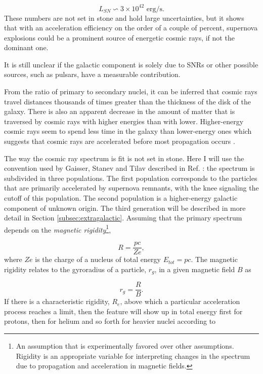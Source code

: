 \begin{equation}
L_{SN} \backsim 3 \times 10^{42} \textrm{ erg/s}.
\end{equation}
These numbers are not set in stone and hold large uncertainties, but it shows that with an acceleration efficiency on the order of a couple of percent, supernova explosions could be a prominent source of energetic cosmic rays, if not the dominant one.

It is still unclear if the galactic component is solely due to SNRs or other possible sources, such as pulsars, have a measurable contribution.

From the ratio of primary to secondary nuclei, it can be inferred that cosmic rays travel distances thousands of times greater than the thickness of the disk of the galaxy. There is also an apparent decrease in the amount of matter that is traversed by cosmic rays with higher energies than with lower. Higher-energy cosmic rays seem to spend less time in the galaxy than lower-energy ones which suggests that cosmic rays are accelerated before most propagation occurs \cite{Gaisser:2016uoy}.

The way the cosmic ray spectrum is fit is not set in stone. Here I will use the convention used by Gaisser, Stanev and Tilav described in Ref. \cite{Gaisser:2013bla}: the spectrum is subdivided in three populations. The first population corresponds to the particles that are primarily accelerated by supernova remnants, with the knee signaling the cutoff of this population. The second population is a higher-energy galactic component of unknown origin. The third generation will be described in more detail in Section \ref{subsec:extragalactic}. Assuming that the primary spectrum depends on the \textit{magnetic rigidity}\footnote{An assumption that is experimentally favored over other assumptions. Rigidity is an appropriate variable for interpreting changes in the spectrum due to propagation and acceleration in magnetic fields.},

\begin{equation}
R = \frac{pc}{Ze},
\end{equation}
where $Ze$ is the charge of a nucleus of total energy $E_{tot} = pc$. The magnetic rigidity relates to the gyroradius of a particle, $r_g$, in a given magnetic field $B$ as

\begin{equation}
\label{eq:gyro}
r_g = \frac{R}{B}.
\end{equation}
If there is a characteristic rigidity, $R_e$, above which a particular acceleration process reaches a limit, then the feature will show up in total energy first for protons, then for helium and so forth for heavier nuclei according to

